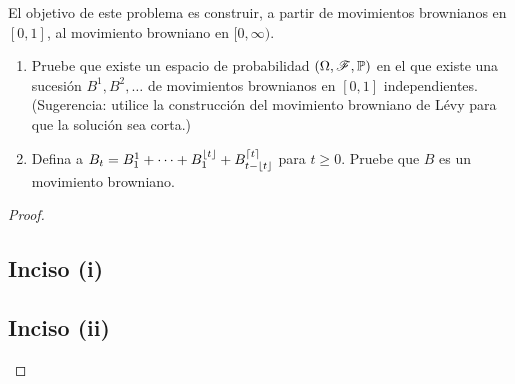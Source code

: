\begin{problema}
	El objetivo de este problema es construir, a partir de movimientos brownianos en $[0,1]$, al movimiento browniano en $[0,\infty)$.
	\begin{enumerate}
		\item 
			Pruebe que existe un espacio de probabilidad $ \left(  \Omega ,\mathscr{F} , \mathbb{P}  \right)  $ en el que existe 
			una sucesi\'on $B^1,B^2,\ldots$ de movimientos brownianos en $[0,1]$ 
			independientes. (Sugerencia: utilice la construcci\'on del movimiento 
			browniano de L\'evy  para que la soluci\'on sea corta.)
			
		\item 
			Defina a $B_t=B^1_1+\cdots+B^{\lfloor t\rfloor}_1+B^{\lceil t \rceil}_{t-\lfloor t\rfloor}$ 
			para $t\geq 0$. Pruebe que $B$ es un movimiento browniano. 
		
	\end{enumerate}
\end{problema}

\begin{proof}
    \subsection{Inciso (i)} \label{problema5_6:inciso1}
    
    \newpage

    \subsection{Inciso (ii)} \label{problema5_6:inciso2}
     
\end{proof}